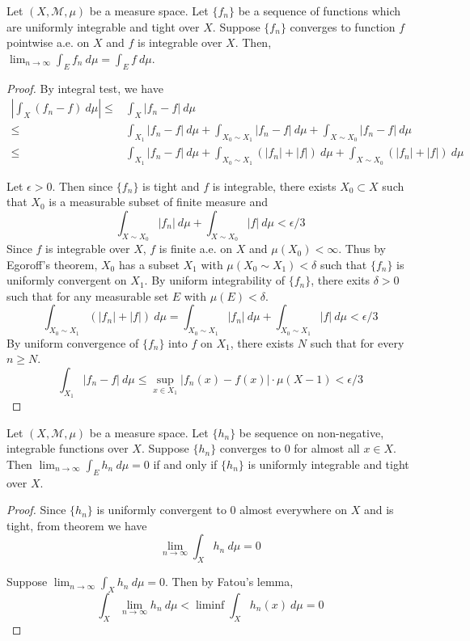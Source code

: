 \begin{theorem}
	Let $(X,\mathcal{M},\mu)$ be a measure space.
	Let $\{ f_n \}$ be a sequence of functions which are uniformly integrable and tight over $X$.
	Suppose $\{ f_n \}$ converges to function $f$ pointwise a.e. on $X$ and $f$ is integrable over $X$.
	Then,
	$\displaystyle \lim_{n \to \infty} \int_E f_n \ d\mu = \int_E f \ d\mu$.
\end{theorem}
\begin{proof}
	By integral test, we have
	\begin{align*}
		\left| \int_X (f_n - f) \ d\mu  \right| \le & \int_X |f_n - f| \ d\mu\\
		\le & \int_{X_1} |f_n-f|\ d\mu + \int_{X_0 \sim X_1} |f_n-f| \ d\mu + \int_{X \sim X_0} |f_n-f| \ d\mu \\
		\le & \int_{X_1} |f_n-f|\ d\mu + \int_{X_0 \sim X_1} (|f_n| + |f|) \ d\mu + \int_{X \sim X_0} (|f_n| + |f|) \ d\mu
	\end{align*}

	Let $\epsilon > 0$.
	Then since $\{ f_n \}$ is tight and $f$ is integrable, there exists $X_0 \subset X$ such that $X_0$ is a measurable subset of finite measure and
	\begin{equation}
		\int_{X \sim X_0} |f_n| \ d\mu + \int_{X \sim X_0} |f|\ d\mu < \epsilon/3
	\end{equation}
	Since $f$ is integrable over $X$, $f$ is finite a.e. on $X$ and $\mu(X_0) < \infty$.
	Thus by Egoroff's theorem, $X_0$ has a subset $X_1$ with $\mu(X_0 \sim X_1) < \delta$ such that $\{ f_n \}$ is uniformly convergent on $X_1$.
	By uniform integrability of $\{ f_n \}$, there exits $\delta > 0$ such that for any measurable set $E$ with $\mu(E) < \delta$.
	\begin{equation}
		\int_{X_0 \sim X_1} (|f_n|+ |f|) \ d\mu = \int_{X_0 \sim X_1} |f_n| \ d\mu + \int_{X_0 \sim X_1} |f|\ d\mu < \epsilon/3
	\end{equation}
	By uniform convergence of $\{ f_n \}$ into $f$ on $X_1$, there exists $N$ such that for every $n \ge N$.
	\begin{equation}
		\int_{X_1} |f_n -f| \ d\mu \le \sup_{x \in X_1} |f_n(x) -f(x)| \cdot \mu(X-1) < \epsilon/3
	\end{equation}
\end{proof}

\begin{corollary}
	Let $(X,\mathcal{M},\mu)$ be a measure space.
	Let $\{ h_n \}$  be sequence on non-negative, integrable functions over $X$.
	Suppose $\{ h_n \}$ converges to $0$ for almost all $x \in X$.
	Then $\displaystyle \lim_{n \to \infty} \int_E h_n \ d\mu = 0$ if and only if $\{ h_n \}$ is uniformly integrable and tight over $X$.
\end{corollary}
\begin{proof}
	Since $\{ h_n \}$ is uniformly convergent to $0$ almost everywhere on $X$ and is tight, from theorem we have 
	$$ \lim_{n \to \infty} \int_X h_n \ d\mu = 0$$

	Suppose $\displaystyle \lim_{n \to \infty} \int_X h_n \ d\mu = 0$.
	Then by Fatou's lemma,
	$$ \int_X \lim_{n \to \infty} h_n \ d\mu < \liminf \int_X h_n(x) \ d\mu = 0 $$
\end{proof}


